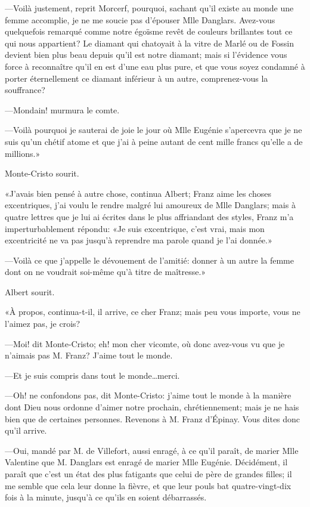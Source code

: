 —Voilà justement, reprit Morcerf, pourquoi, sachant qu'il existe au monde une femme accomplie, je ne me soucie pas d'épouser Mlle Danglars. Avez-vous quelquefois remarqué comme notre égoïsme revêt de couleurs brillantes tout ce qui nous appartient? Le diamant qui chatoyait à la vitre de Marlé ou de Fossin devient bien plus beau depuis qu'il est notre diamant; mais si l'évidence vous force à reconnaître qu'il en est d'une eau plus pure, et que vous soyez condamné à porter éternellement ce diamant inférieur à un autre, comprenez-vous la souffrance? 

—Mondain! murmura le comte. 

—Voilà pourquoi je sauterai de joie le jour où Mlle Eugénie s'apercevra que je ne suis qu'un chétif atome et que j'ai à peine autant de cent mille francs qu'elle a de millions.»  

Monte-Cristo sourit. 

«J'avais bien pensé à autre chose, continua Albert; Franz aime les choses excentriques, j'ai voulu le rendre malgré lui amoureux de Mlle Danglars; mais à quatre lettres que je lui ai écrites dans le plus affriandant des styles, Franz m'a imperturbablement répondu: «Je suis excentrique, c'est vrai, mais mon excentricité ne va pas jusqu'à reprendre ma parole quand je l'ai donnée.» 

—Voilà ce que j'appelle le dévouement de l'amitié: donner à un autre la femme dont on ne voudrait soi-même qu'à titre de maîtresse.» 

Albert sourit. 

«À propos, continua-t-il, il arrive, ce cher Franz; mais peu vous importe, vous ne l'aimez pas, je crois? 

—Moi! dit Monte-Cristo; eh! mon cher vicomte, où donc avez-vous vu que je n'aimais pas M. Franz? J'aime tout le monde. 

—Et je suis compris dans tout le monde\dots merci. 

—Oh! ne confondons pas, dit Monte-Cristo: j'aime tout le monde à la manière dont Dieu nous ordonne d'aimer notre prochain, chrétiennement; mais je ne hais bien que de certaines personnes. Revenons à M. Franz d'Épinay. Vous dites donc qu'il arrive. 

—Oui, mandé par M. de Villefort, aussi enragé, à ce qu'il paraît, de marier Mlle Valentine que M. Danglars est enragé de marier Mlle Eugénie. Décidément, il paraît que c'est un état des plus fatigants que celui de père de grandes filles; il me semble que cela leur donne la fièvre, et que leur pouls bat quatre-vingt-dix fois à la minute, jusqu'à ce qu'ils en soient débarrassés. 

